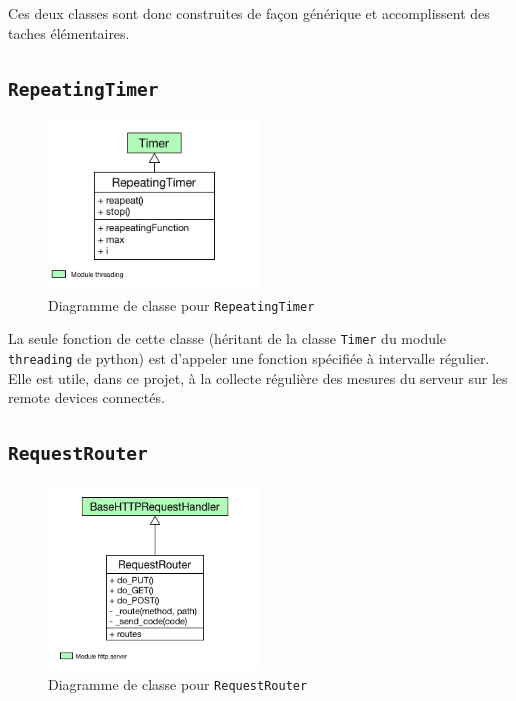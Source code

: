 \documentclass[11pt,a4paper,11pt]{report}
\begin{document}
Ces deux classes sont donc construites de façon générique et accomplissent des taches élémentaires.


\subsection{\texttt{RepeatingTimer}}

\begin{figure}[h]
\centering
\includegraphics[width=0.5\textwidth]{images/RepeatingTimer_class_diagram.png}
\caption{Diagramme de classe pour \texttt{RepeatingTimer}}
\end{figure}

La seule fonction de cette classe (héritant de la classe \texttt{Timer} du module \texttt{threading} de python) est d'appeler une fonction spécifiée à intervalle régulier.
Elle est utile, dans ce projet, à la collecte régulière des mesures du serveur sur les remote devices connectés.\\

\subsection{\texttt{RequestRouter}}

\begin{figure}[h]
\centering
\includegraphics[width=0.5\textwidth]{images/RequestRouter_class_diagram.png}
\caption{Diagramme de classe pour \texttt{RequestRouter}}
\end{figure}
\end{document}
